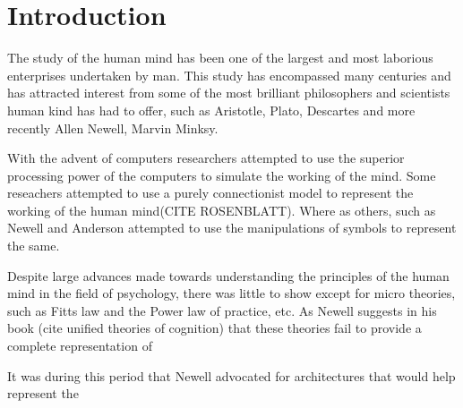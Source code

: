 \chapter{Introduction}
\label{chap-one}


The study of the human mind has been one of the largest and most
laborious enterprises undertaken by man. This study has encompassed many
centuries and has attracted interest from some of the most brilliant
philosophers and scientists human kind has had to offer, such as
Aristotle, Plato, Descartes and more recently Allen Newell, Marvin
Minksy. 

With the advent of computers researchers attempted to use the superior
processing power of the computers to simulate the working of the
mind. Some reseachers attempted to use a purely connectionist model to
represent the working of the human mind(CITE ROSENBLATT). Where as
others, such as Newell and Anderson attempted to use the manipulations of symbols
to represent the same. 



Despite large advances made towards understanding the principles of
the human mind in the field of psychology, there was little to show
except for micro theories, such as Fitts law and the Power law of
practice, etc. As Newell suggests in his book (cite unified theories
of cognition) that these theories fail to provide a complete
representation of 

It was during this period that Newell advocated for
architectures that would help represent the 




